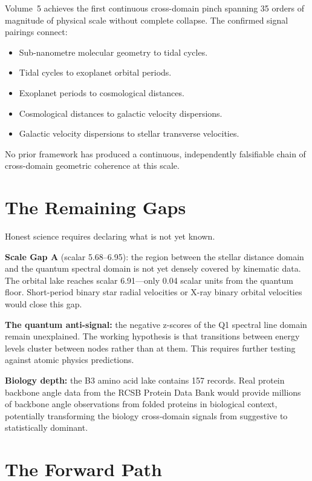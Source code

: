 \documentclass[11pt, letterpaper, openany]{book}
\begin{document}
Volume~5 achieves the first continuous cross-domain pinch spanning 35 orders of magnitude of
physical scale without complete collapse. The confirmed signal pairings connect:

\begin{itemize}
    \item Sub-nanometre molecular geometry to tidal cycles.
    \item Tidal cycles to exoplanet orbital periods.
    \item Exoplanet periods to cosmological distances.
    \item Cosmological distances to galactic velocity dispersions.
    \item Galactic velocity dispersions to stellar transverse velocities.
\end{itemize}

No prior framework has produced a continuous, independently falsifiable chain of cross-domain
geometric coherence at this scale.

\section*{The Remaining Gaps}

Honest science requires declaring what is not yet known.

\textbf{Scale Gap A} (scalar 5.68--6.95): the region between the stellar distance domain
and the quantum spectral domain is not yet densely covered by kinematic data. The orbital
lake reaches scalar 6.91---only 0.04 scalar units from the quantum floor. Short-period binary
star radial velocities or X-ray binary orbital velocities would close this gap.

\textbf{The quantum anti-signal:} the negative z-scores of the Q1 spectral line domain
remain unexplained. The working hypothesis is that transitions between energy levels cluster
between nodes rather than at them. This requires further testing against atomic physics
predictions.

\textbf{Biology depth:} the B3 amino acid lake contains 157 records. Real protein backbone
angle data from the RCSB Protein Data Bank would provide millions of backbone angle
observations from folded proteins in biological context, potentially transforming the
biology cross-domain signals from suggestive to statistically dominant.

\section*{The Forward Path}
\end{document}
